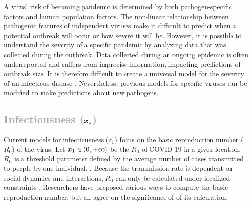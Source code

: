 \documentclass[12pt]{article}
\begin{document}
A virus' risk of becoming pandemic is determined by both pathogen-specific factors and human population factors. The non-linear relationship between pathogenic features of independent viruses make it difficult to predict when a potential outbreak will occur or how severe it will be.
However, it is possible to understand the severity of a specific pandemic by analyzing data that was collected during the outbreak. 
Data collected during an ongoing epidemic is often underreported and suffers from imprecise information, impacting predictions of outbreak size. It is therefore difficult to create a universal model for the severity of an infectious disease  \cite{modInfectDisease}. Nevertheless, previous models for specific viruses can be modified to make predictions about new pathogens. 

\textcolor{darkgray}{\subsection{Infectiousness ($\boldsymbol{x}_1$)}}

Current models for infectiousness ($z_1$) focus on the basic reproduction number ($R_0$) of the virus. Let $\boldsymbol{x}_1 \in (0, +\infty)$ be the $R_0$ of COVID-19 in a given location. $R_0$ is a threshold parameter defined by the average number of cases transmitted to people by one individual. \cite{calcR_0}. Because the transmission rate is dependent on social dynamics and interactions, $R_0$ can only be calculated under localized constraints \cite{effectiveR_0}. Researchers have proposed various ways to compute the basic reproduction number, but all agree on the significance of of its calculation. 
\end{document}
